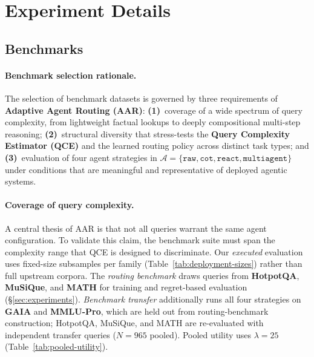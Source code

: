 \appendix

\section{Experiment Details}
\label{app:experiment-details}

\subsection{Benchmarks}
\label{app:benchmarks}
\label{app:dataset-rationale}
\label{app:dataset-descriptions}

\paragraph{Benchmark selection rationale.}
The selection of benchmark datasets is governed by three requirements of \textbf{Adaptive Agent
Routing (AAR)}:
\textbf{(1)}~coverage of a wide spectrum of query complexity, from lightweight factual lookups to
deeply compositional multi-step reasoning;
\textbf{(2)}~structural diversity that stress-tests the \textbf{Query Complexity Estimator (QCE)}
and the learned routing policy across distinct task types; and
\textbf{(3)}~evaluation of four agent strategies in
$\mathcal{A}=\{\texttt{raw},\texttt{cot},\texttt{react},\texttt{multiagent}\}$ under conditions
that are meaningful and representative of deployed agentic systems.

\paragraph{Coverage of query complexity.}
A central thesis of AAR is that not all queries warrant the same agent configuration.
To validate this claim, the benchmark suite must span the complexity range that QCE is designed to
discriminate.
Our \emph{executed} evaluation uses fixed-size subsamples per family
(Table~\ref{tab:deployment-sizes}) rather than full upstream corpora.
The \emph{routing benchmark} draws queries from \textbf{HotpotQA}, \textbf{MuSiQue}, and
\textbf{MATH} for training and regret-based evaluation (\S\ref{sec:experiments}).
\emph{Benchmark transfer} additionally runs all four strategies on \textbf{GAIA} and
\textbf{MMLU-Pro}, which are held out from routing-benchmark construction; HotpotQA, MuSiQue, and
MATH are re-evaluated with independent transfer queries ($N{=}965$ pooled).
Pooled utility uses $\lambda{=}25$ (Table~\ref{tab:pooled-utility}).

